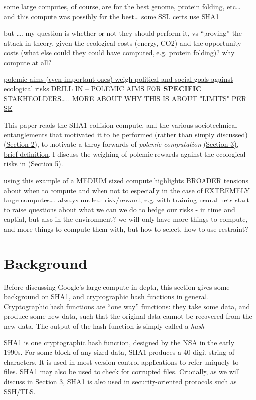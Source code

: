 \documentclass[sigconf]{acmart}
\begin{document}
some large computes, of course, are for the best
genome, protein folding, etc\ldots{}
and this compute was possibly for the best\ldots{} some SSL certs use SHA1

but \ldots{}.
my question is whether or not they should perform it, 
vs ``proving'' the attack in theory,
given the ecological costs (energy, CO2) and the opportunity costs (what else could they could have computed, e.g. protein folding)?
why compute at all?


\uline{polemic aims (even important ones) weigh political and social goals against ecological risks}
\uline{DRILL IN -- POLEMIC AIMS FOR \textbf{SPECIFIC} STAKHEOLDERS\ldots{}..}
\uline{MORE ABOUT WHY THIS IS ABOUT "LIMITS" PER SE}


This paper reads the SHA1 collision compute, and the various sociotechnical entanglements that motivated it to be performed (rather than simply discussed) \uline{(Section 2)},
to motivate a throy forwards of \emph{polemic computation} \uline{(Section 3)}, 
\uline{brief definition}.
I discuss the weighing of polemic rewards against the ecological risks in \uline{(Section 5)}.

using this example of a MEDIUM sized compute
highlights BROADER tensions about when to compute and when not to
especially in the case of EXTREMELY large computes\ldots{}.
always unclear risk/reward, e.g. with training neural nets
start to raise questions about what we can we do to hedge our risks - in time and captial, but also in the environment?
we will only have more things to compute,
and more things to compute them with,
but how to select, how to use restraint?


\section{Background}
\label{sec:orge3905a8}


Before discussing Google's large compute in depth,
this section gives some background on SHA1, and cryptographic hash functions in general.
Cryptographic hash functions are ``one way'' functions: 
they take some data, and produce some new data, such that the original data cannot be recovered from the new data. The output of the hash function is simply called a \emph{hash}.

SHA1 is one cryptographic hash function, designed by the NSA in the early 1990s.
For some block of any-sized data, SHA1 produces a 40-digit string of characters.
It is used in most version control applications to refer uniquely to files. SHA1 may also be used to check for corrupted files. 
Crucially, as we will discuss in \uline{Section 3}, SHA1 is also used in security-oriented protocols such as SSH/TLS.
\end{document}
